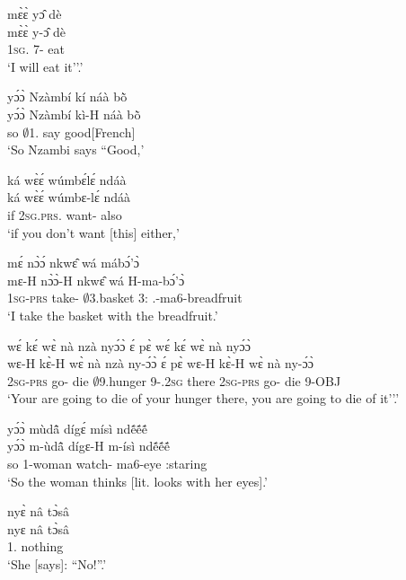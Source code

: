 \begin{exe}[(N234)]
\exN\label{n76}
  \glll mɛ̀ɛ̀ yɔ̂ dè \\
         mɛ̀ɛ̀ y-ɔ̂ dè \\
        1\textsc{sg}.{\FUT} 7-{\OBJ} eat  \\
    \trans `I will eat it''.'
 
\exN\label{n77}
  \glll yɔ́ɔ̀ Nzàmbí kí náà bõ̀ \\
       yɔ́ɔ̀ Nzàmbí kì-H náà bõ̀ \\
          so $\emptyset$1.{\PN} say {\COMP} good[French]  \\
    \trans `So Nzambi says ``Good,'
 
\exN\label{n78}
  \glll ká wɛ̀ɛ́ wúmbɛ́lɛ́ ndáà \\
        ká wɛ̀ɛ́ wúmbɛ-lɛ́ ndáà \\
         if 2\textsc{sg}.\textsc{prs}.{\NEG} want-{\NEG} also   \\
    \trans `if you don't want [this] either,'
 
\exN\label{n79}
  \glll mɛ́ nɔ̀ɔ́ nkwɛ̂ wá mábɔ́'ɔ̀ \\
        mɛ-H nɔ̀ɔ̀-H nkwɛ̂ wá H-ma-bɔ́'ɔ̀ \\
         1\textsc{sg}-\textsc{prs} take-{\R} $\emptyset$3.basket 3:{\ATT}  {\OBJ}.{\LINK}-ma6-breadfruit\\
    \trans `I take the basket with the breadfruit.'
 
\exN\label{n80}
  \glll wɛ́ kɛ́ wɛ̀ nà nzà nyɔ́ɔ̀ ɛ́ pɛ̀ wɛ́ kɛ́ wɛ̀ nà nyɔ́ɔ̀ \\
       wɛ-H kɛ̀-H wɛ̀ nà nzà ny-ɔ́ɔ̀ ɛ́ pɛ̀ wɛ-H kɛ̀-H wɛ̀ nà ny-ɔ́ɔ̀ \\
        2\textsc{sg}-\textsc{prs} go-{\R} die {\COM}  $\emptyset$9.hunger 9-{\POSS}.2\textsc{sg} {\LOC} there 2\textsc{sg}-\textsc{prs} go-{\R} die {\COM} 9-OBJ\\
    \trans `Your are going to die of your hunger there, you are going to die of it''.'
 
\exN\label{n81}
  \glll yɔ́ɔ̀ mùdã̂ dígɛ́ mísì ndẽ́ẽ́ẽ́ \\
        yɔ́ɔ̀ m-ùdã̂ dígɛ-H m-ísì ndẽ́ẽ́ẽ́ \\
        so {\N}1-woman watch-{\R} ma6-eye {\IDEO}:staring \\
    \trans `So the woman thinks [lit. looks with her eyes].'
 
\exN\label{n82}
  \glll nyɛ̀ nâ tɔ̀sâ \\
          nyɛ nâ tɔ̀sâ \\
       1.{\SBJ}  {\COMP} nothing  \\
    \trans `She [says]: ``No!''.'
 

\end{exe}

